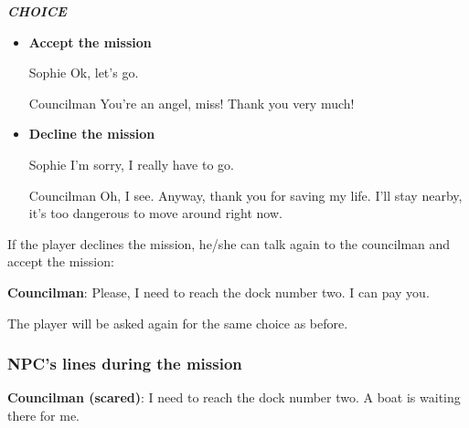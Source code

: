 \textit{\textbf{CHOICE}}
\begin{itemize}
\item \textbf{Accept the mission}

\begin{screenplay}

\begin{dialogue}{Sophie}
Ok, let's go.
\end{dialogue}

\begin{dialogue}[grateful]{Councilman}
You're an angel, miss! Thank you very much!
\end{dialogue}

\end{screenplay}

\item \textbf{Decline the mission}

\begin{screenplay}

\begin{dialogue}{Sophie}
I'm sorry, I really have to go.
\end{dialogue}

\begin{dialogue}[disappointed]{Councilman}
Oh, I see. Anyway, thank you for saving my life. I'll stay nearby, it's too dangerous to move around right now.
\end{dialogue}

\end{screenplay}

\end{itemize}

If the player declines the mission, he/she can talk again to the councilman and accept the mission:

\hspace{1em} \textbf{Councilman}: Please, I need to reach the dock number two. I can pay you.

\hspace{1em} The player will be asked again for the same choice as before.

\subsubsection*{NPC's lines during the mission}
\textbf{Councilman (scared)}: I need to reach the dock number two. A boat is waiting there for me.

